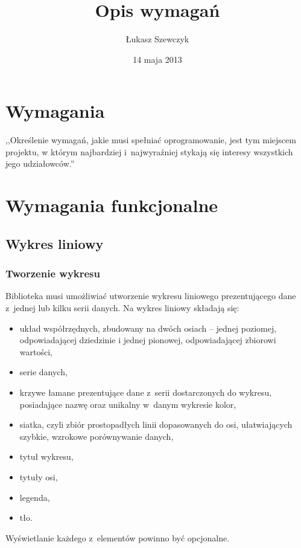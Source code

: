 \documentclass[11pt,twoside,a4paper,final]{article}
\begin{document}
\date{14 maja 2013}
\title{Opis wymagań}

\author{Łukasz Szewczyk}

\maketitle

\section{Wymagania}
,,Określenie wymagań, jakie musi spełniać oprogramowanie, jest tym miejscem projektu, w którym najbardziej i~najwyraźniej stykają się interesy wszystkich jego udziałowców.''~\cite{sacha-wymagania}

\section{Wymagania funkcjonalne}
\subsection{Wykres liniowy}
\subsubsection{Tworzenie wykresu}
Biblioteka musi umożliwiać utworzenie wykresu liniowego prezentującego dane z~jednej lub kilku serii danych. Na wykres liniowy składają się:
\begin{itemize}
\item{układ współrzędnych, zbudowany na dwóch osiach -- jednej poziomej, odpowiadającej dziedzinie i jednej pionowej, odpowiadającej zbiorowi wartości,}
\item{serie danych,}
\item{krzywe łamane prezentujące dane z~serii dostarczonych do wykresu, posiadające nazwę oraz unikalny w~danym wykresie kolor,}
\item{siatka, czyli zbiór prostopadłych linii dopasowanych do osi, ułatwiających szybkie, wzrokowe porównywanie danych,}
\item{tytuł wykresu,}
\item{tytuły osi,}
\item{legenda,}
\item{tło.}
\end{itemize}

Wyświetlanie każdego z~elementów powinno być opcjonalne. 
\end{document}
